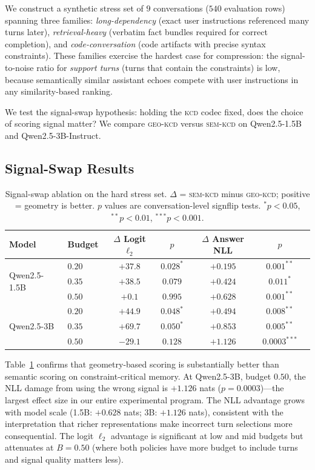 \documentclass[11pt]{article}
\newcommand{\kcd}{\textsc{kcd}}
\newcommand{\geokcd}{\textsc{geo-kcd}}
\newcommand{\semkcd}{\textsc{sem-kcd}}
\begin{document}
We construct a synthetic stress set of $9$ conversations
($540$ evaluation rows) spanning three families:
\emph{long-dependency} (exact user instructions referenced many turns later),
\emph{retrieval-heavy} (verbatim fact bundles required for correct completion),
and \emph{code-conversation} (code artifacts with precise syntax constraints).
These families exercise the hardest case for compression:
the signal-to-noise ratio for \emph{support turns}
(turns that contain the constraints) is low,
because semantically similar assistant echoes compete with user instructions
in any similarity-based ranking.

We test the signal-swap hypothesis:
holding the \kcd{} codec fixed, does the choice of scoring signal matter?
We compare \geokcd{} versus \semkcd{} on Qwen2.5-1.5B and Qwen2.5-3B-Instruct.

\subsection{Signal-Swap Results}

\begin{table}[t]
\centering
\caption{Signal-swap ablation on the hard stress set.
$\Delta$ = \semkcd{} minus \geokcd{}; positive = geometry is better.
$p$ values are conversation-level signflip tests.
$^*p{<}0.05$, $^{**}p{<}0.01$, $^{***}p{<}0.001$.}
\label{tab:hardset}
\setlength{\tabcolsep}{5pt}
\begin{tabular}{llccccc}
\toprule
Model & Budget & $\Delta$ Logit $\ell_2$ & $p$ & $\Delta$ Answer NLL & $p$ \\
\midrule
\multirow{3}{*}{Qwen2.5-1.5B}
  & $0.20$ & $+37.8$ & $0.028^*$  & $+0.195$ & $0.001^{**}$  \\
  & $0.35$ & $+38.5$ & $0.079$     & $+0.424$ & $0.011^*$     \\
  & $0.50$ & $+0.1$  & $0.995$     & $+0.628$ & $0.001^{**}$  \\
\midrule
\multirow{3}{*}{Qwen2.5-3B}
  & $0.20$ & $+44.9$ & $0.048^*$   & $+0.494$ & $0.008^{**}$  \\
  & $0.35$ & $+69.7$ & $0.050^*$   & $+0.853$ & $0.005^{**}$  \\
  & $0.50$ & $-29.1$ & $0.128$     & $+1.126$ & $\mathbf{0.0003^{***}}$ \\
\bottomrule
\end{tabular}
\end{table}

Table~\ref{tab:hardset} confirms that geometry-based scoring is
substantially better than semantic scoring on constraint-critical memory.
At Qwen2.5-3B, budget $0.50$, the NLL damage from using the wrong
signal is $+1.126$ nats ($p = 0.0003$)---the largest effect size in
our entire experimental program.
The NLL advantage grows with model scale
(1.5B: $+0.628$ nats; 3B: $+1.126$ nats),
consistent with the interpretation that richer representations
make incorrect turn selections more consequential.
The logit $\ell_2$ advantage is significant at low and mid budgets
but attenuates at $B{=}0.50$ (where both policies have more budget
to include turns and signal quality matters less).
\end{document}

